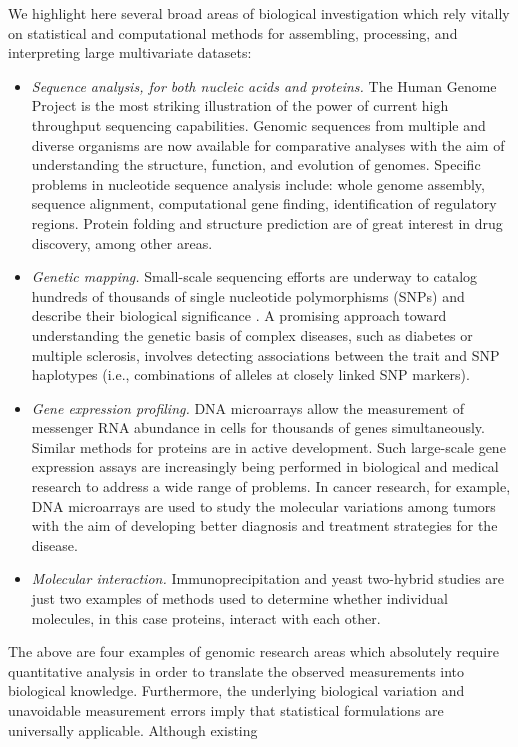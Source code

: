 \documentclass{amsart}
\begin{document}
We highlight here several broad areas of biological investigation
which rely vitally on statistical and computational methods for
assembling, processing, and interpreting large multivariate datasets:
\begin{itemize}
\item {\em Sequence analysis, for both nucleic acids and proteins.}
The Human Genome Project is the most striking illustration of the
power of current high throughput sequencing capabilities. Genomic
sequences from multiple and diverse organisms are now available for
comparative analyses with the aim of understanding the structure,
function, and evolution of genomes. Specific problems in nucleotide
sequence analysis include: whole genome assembly, sequence alignment,
computational gene finding, identification of regulatory
regions. Protein folding and structure prediction are of great
interest in drug discovery, among other areas.
\item {\em Genetic mapping.}  Small-scale sequencing efforts are
underway to catalog hundreds of thousands of single nucleotide
polymorphisms (SNPs) and describe their biological significance . A
promising approach toward understanding the genetic basis of complex
diseases, such as diabetes or multiple sclerosis, involves detecting
associations between the trait and SNP haplotypes (i.e., combinations
of alleles at closely linked SNP markers).
\item {\em Gene expression profiling.}  DNA microarrays allow the
measurement of messenger RNA abundance in cells for thousands of genes
simultaneously.  Similar methods for proteins are in active
development. Such large-scale gene expression assays are increasingly
being performed in biological and medical research to address a wide
range of problems.  In cancer research, for example, DNA microarrays
are used to study the molecular variations among tumors with the aim
of developing better diagnosis and treatment strategies for the
disease.
\item {\em Molecular interaction.}  Immunoprecipitation and yeast
two-hybrid studies are just two examples of methods used to determine
whether individual molecules, in this case proteins, interact with
each other.
\end{itemize}
The above are four examples of genomic research areas which absolutely
require quantitative analysis in order to translate the observed
measurements into biological knowledge. Furthermore, the underlying
biological variation and unavoidable measurement errors imply that
statistical formulations are universally applicable. Although existing
\end{document}
